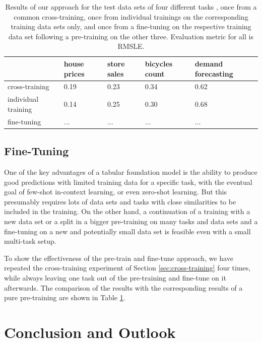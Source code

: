 \documentclass{article}
\begin{document}
\begin{table}
 \caption{Results of our approach for the test data sets of four different tasks \cite{house-prices,store-sales,bicycles-count,demand-forecasting}, once from a common cross-training, once from individual trainings on the corresponding training data sets only, and once from a fine-tuning on the respective training data set following a pre-training on the other three. Evaluation metric for all is RMSLE.}
  \centering
  \begin{tabular}{lllll}
    \toprule
     & house prices & store sales & bicycles count & demand forecasting \\
    \midrule
    cross-training & 0.19 & 0.23 & 0.34 & 0.62 \\
    individual training & 0.14 & 0.25 & 0.30 & 0.68 \\
    fine-tuning & ... & ... & ... & ... \\
    \bottomrule
  \end{tabular}
  \label{tab:cross-training}
\end{table}

\subsection{Fine-Tuning}
\label{sec:fine-tuning}
One of the key advantages of a tabular foundation model is the ability to produce good predictions with limited training data for a specific task, with the eventual goal of few-shot in-context learning, or even zero-shot learning. But this presumably requires lots of data sets and tasks with close similarities to be included in the training. On the other hand, a continuation of a training with a new data set or a split in a bigger pre-training on many tasks and data sets and a fine-tuning on a new and potentially small data set is feasible even with a small multi-task setup.

To show the effectiveness of the pre-train and fine-tune approach, we have repeated the cross-training experiment of Section \ref{sec:cross-training} four times, while always leaving one task out of the pre-training and fine-tune on it afterwards. The comparison of the results with the corresponding results of a pure pre-training are shown in Table \ref{tab:cross-training}.


\section{Conclusion and Outlook}
\label{sec:conclusion}
\end{document}
